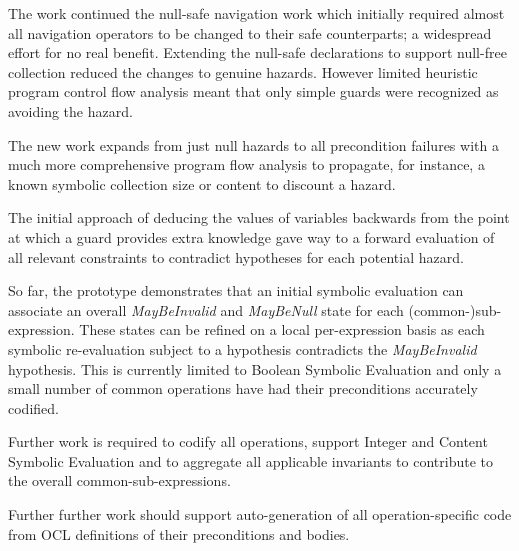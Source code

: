 \documentclass[
]{ceurart}
\begin{document}
The work continued the null-safe navigation work \cite{Safe OCL} which initially required almost all navigation operators to be changed to their safe counterparts; a widespread effort for no real benefit. Extending the null-safe declarations to support null-free collection reduced the changes to genuine hazards. However limited heuristic program control flow analysis meant that only simple guards were recognized as avoiding the hazard.

The new work expands from just null hazards to all precondition failures with a much more comprehensive program flow analysis to propagate, for instance, a known symbolic collection size or content to discount a hazard.

The initial approach of deducing the values of variables backwards from the point at which a guard provides extra knowledge gave way to a forward evaluation of all relevant constraints to contradict hypotheses for each potential hazard.

So far, the prototype demonstrates that an initial symbolic evaluation can associate an overall \emph{MayBeInvalid} and \emph{MayBeNull} state for each (common-)sub-expression. These states can be refined on a local per-expression basis as each symbolic re-evaluation subject to a hypothesis contradicts the \emph{MayBeInvalid} hypothesis. This is currently limited to Boolean Symbolic Evaluation and only a small number of common operations have had their preconditions accurately codified.

Further work is required to codify all operations, support Integer and Content Symbolic Evaluation and to aggregate all applicable invariants to contribute to the overall common-sub-expressions.

Further further work should support auto-generation of all operation-specific code from OCL definitions of their preconditions and bodies. 





\end{document}
